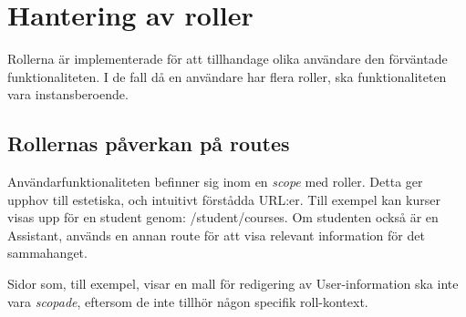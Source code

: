 \section{Hantering av roller}

Rollerna är implementerade för att tillhandage olika användare den förväntade funktionaliteten. I de fall då en användare har flera roller, ska funktionaliteten vara instansberoende.  

\subsection{Rollernas påverkan på routes}
Användarfunktionaliteten befinner sig inom en \emph{scope} med roller. Detta ger upphov till estetiska, och intuitivt förstådda URL:er. Till exempel kan kurser visas upp för en student genom: /student/courses. Om studenten också är en Assistant, används en annan route för att visa relevant information för det sammahanget.

Sidor som, till exempel,  visar en mall för redigering av User-information ska inte vara \emph{scopade}, eftersom de inte tillhör någon specifik roll-kontext.
